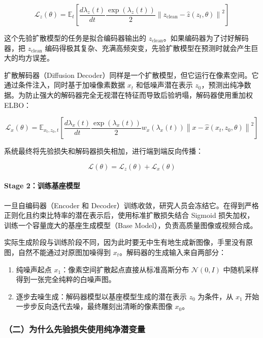 \[
\mathcal{L}_z(\theta)=
\mathbb{E}_t
\left[
\frac{d\lambda_z(t)}{dt}
\frac{\exp(\lambda_z(t))}{2}
\left\|
z_{\mathrm{clean}}-\hat{z}(z_t,\theta)
\right\|^2
\right]
\]

这个先验扩散模型的任务是拟合编码器输出的 \(z_{\mathrm{clean}}\)。如果编码器为了讨好解码器，把 \(z_{\mathrm{clean}}\) 编码得极其复杂、充满高频突变，先验扩散模型在预测时就会产生巨大的均方误差。

扩散解码器（Diffusion Decoder）同样是一个扩散模型，但它运行在像素空间。它通过条件注入，同时基于加噪像素数据 \(x_t\) 和低噪声潜在表示 \(z_0\)，预测出纯净数据。为防止强大的解码器完全无视潜在特征而导致后验坍塌，解码器使用重加权 ELBO：

\[
\mathcal{L}_x(\theta)=
\mathbb{E}_{x_t,z_0,t}
\left[
\frac{d\lambda_x(t)}{dt}
\frac{\exp(\lambda_x(t))}{2}
w_x(\lambda_x(t))
\left\|
x-\hat{x}(x_t,z_0,\theta)
\right\|^2
\right]
\]

系统最终将先验损失和解码器损失相加，进行端到端反向传播：

\[
\mathcal{L}(\theta)=\mathcal{L}_z(\theta)+\mathcal{L}_x(\theta)
\]

\hypertarget{stage-2ux8badux7ec3ux57faux5ea7ux6a21ux578b}{%
\paragraph{Stage 2：训练基座模型}\label{stage-2ux8badux7ec3ux57faux5ea7ux6a21ux578b}}

一旦自编码器（Encoder 和 Decoder）训练收敛，研究人员会冻结它。在得到严格正则化且约束比特率的潜在表示后，使用标准扩散损失结合 Sigmoid 损失加权，训练一个容量庞大的基座生成模型（Base Model），负责高质量图像或视频合成。

实际生成阶段与训练阶段不同，因为此时要无中生有地生成新图像，手里没有原图，自然不能通过对原图加噪得到 \(x_t\)。解码器的生成输入来自两部分：

\begin{enumerate}
\def\labelenumi{\arabic{enumi}.}
\tightlist
\item
  纯噪声起点 \(x_1\)：像素空间扩散起点直接从标准高斯分布 \(\mathcal{N}(0,I)\) 中随机采样得到一张完全纯粹的白噪声图。
\item
  逐步去噪生成：解码器模型以基座模型生成的潜在表示 \(z_0\) 为条件，从 \(x_1\) 开始一步步反向迭代去噪，最终雕刻出清晰的像素图像 \(x_0\)。
\end{enumerate}

\hypertarget{ux4e8cux4e3aux4ec0ux4e48ux5148ux9a8cux635fux5931ux4f7fux7528ux7eafux51c0ux6f5cux53d8ux91cf}{%
\subsubsection{（二）为什么先验损失使用纯净潜变量}\label{ux4e8cux4e3aux4ec0ux4e48ux5148ux9a8cux635fux5931ux4f7fux7528ux7eafux51c0ux6f5cux53d8ux91cf}}

